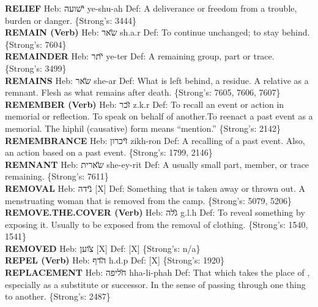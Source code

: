 {\textbf{RELIEF} Heb: {\large\H ישועה} ye-shu-ah Def: A deliverance or freedom from a trouble, burden or danger. \{Strong's: 3444\}\hfill{}\\

\textbf{REMAIN (Verb)} Heb: {\large\H שאר} sh.a.r Def: To continue unchanged; to stay behind. \{Strong's: 7604\}\hfill{}\\

\textbf{REMAINDER} Heb: {\large\H יתר} ye-ter Def: A remaining group, part or trace. \{Strong's: 3499\}\hfill{}\\

\textbf{REMAINS} Heb: {\large\H שאר} she-ar Def: What is left behind, a residue. A relative as a remnant. Flesh as what remains after death. \{Strong's: 7605, 7606, 7607\}\hfill{}\\

\textbf{REMEMBER (Verb)} Heb: {\large\H זכר} z.k.r Def: To recall an event or action in memorial or reflection. To speak on behalf of another.To reenact a past event as a memorial. The hiphil (causative) form means ``mention.'' \{Strong's: 2142\}\hfill{}\\

\textbf{REMEMBRANCE} Heb: {\large\H זיכרון} zikh-ron Def: A recalling of a past event. Also, an action based on a past event. \{Strong's: 1799, 2146\}\hfill{}\\

\textbf{REMNANT} Heb: {\large\H שארית} she-ey-rit Def: A usually small part, member, or trace remaining. \{Strong's: 7611\}\hfill{}\\

\textbf{REMOVAL} Heb: {\large\H נידה} {[}X{]} Def: Something that is taken away or thrown out. A menstruating woman that is removed from the camp. \{Strong's: 5079, 5206\}\hfill{}\\

\textbf{REMOVE.THE.COVER (Verb)} Heb: {\large\H גלה} g.l.h Def: To reveal something by exposing it. Usually to be exposed from the removal of clothing. \{Strong's: 1540, 1541\}\hfill{}\\

\textbf{REMOVED} Heb: {\large\H צוען} {[}X{]} Def: {[}X{]} \{Strong's: n/a\}\hfill{}\\

\textbf{REPEL (Verb)} Heb: {\large\H הדף} h.d.p Def: {[}X{]} \{Strong's: 1920\}\hfill{}\\

\textbf{REPLACEMENT} Heb: {\large\H חליפה} hha-li-phah Def: That which takes the place of , especially as a substitute or successor. In the sense of passing through one thing to another. \{Strong's: 2487\}\hfill{}\\

}
